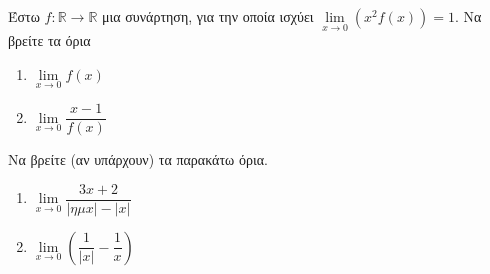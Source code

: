 \documentclass{presentation}
\begin{document}
\begin{askisi}
  Έστω $f:\mathbb{R}\to\mathbb{R}$ μια συνάρτηση, για την οποία ισχύει $\lim\limits_{x \to 0}{ \left( x^2f(x)  \right)  }=1$.
  Να βρείτε τα όρια
  \begin{enumerate}
    \item $\lim\limits_{x \to 0}{ f(x) }$ \pause
    \item $\lim\limits_{x \to 0}{ \dfrac{x-1}{f(x)} }$
  \end{enumerate}
\end{askisi}

\begin{askisi}
  Να βρείτε (αν υπάρχουν) τα παρακάτω όρια.
  \begin{enumerate}
    \item $\lim\limits_{x \to 0}{ \dfrac{3x+2}{|ημx|-|x|} }$ \pause
    \item $\lim\limits_{x \to 0}{ \left( \dfrac{1}{|x|}-\dfrac{1}{x}  \right)  }$
  \end{enumerate}
\end{askisi}

\moodle
\end{document}
